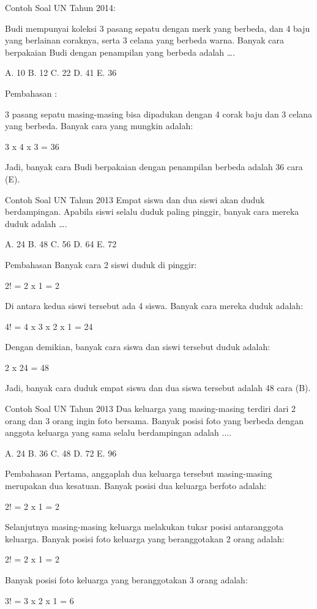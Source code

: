 \documentclass[11pt,fleqn]{book} %
\begin{document}
Contoh Soal UN Tahun 2014:

Budi mempunyai koleksi 3 pasang sepatu dengan merk yang berbeda, dan 4 baju yang berlainan coraknya, serta 3 celana yang berbeda warna. Banyak cara berpakaian Budi dengan penampilan yang berbeda adalah ….

A.   10
B.   12
C.   22
D.   41
E.   36

Pembahasan :

3 pasang sepatu masing-masing bisa dipadukan dengan 4 corak baju dan 3 celana yang berbeda. Banyak cara yang mungkin adalah:

3 x 4 x 3 = 36

Jadi, banyak cara Budi berpakaian dengan penampilan berbeda adalah 36 cara (E).

Contoh Soal UN Tahun 2013
Empat siswa dan dua siswi akan duduk berdampingan. Apabila siswi selalu duduk paling pinggir, banyak cara mereka duduk adalah ….

A.   24
B.   48
C.   56
D.   64
E.   72

Pembahasan
Banyak cara 2 siswi duduk di pinggir:

2! = 2 x 1 = 2

Di antara kedua siswi tersebut ada 4 siswa. Banyak cara mereka duduk adalah:

4! = 4 x 3 x 2 x 1 = 24

Dengan demikian, banyak cara siswa dan siswi tersebut duduk adalah:

2 x 24 = 48

Jadi, banyak cara duduk empat siswa dan dua siswa tersebut adalah 48 cara (B).

Contoh Soal UN Tahun 2013
Dua keluarga yang masing-masing terdiri dari 2 orang dan 3 orang ingin foto bersama. Banyak posisi foto yang berbeda dengan anggota keluarga yang sama selalu berdampingan adalah ....

A.   24
B.   36
C.   48
D.   72
E.   96


Pembahasan
Pertama, anggaplah dua keluarga tersebut masing-masing merupakan dua kesatuan. Banyak posisi dua keluarga berfoto adalah:

2! = 2 x 1 = 2

Selanjutnya masing-masing keluarga melakukan tukar posisi antaranggota keluarga. Banyak posisi foto keluarga yang beranggotakan 2 orang adalah:

2! = 2 x 1 = 2

Banyak posisi foto keluarga yang beranggotakan 3 orang adalah:

3! = 3 x 2 x 1 = 6
\end{document}

